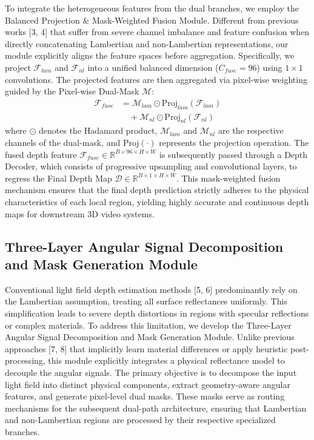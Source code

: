 \documentclass[lettersize,journal]{IEEEtran}
\begin{document}
To integrate the heterogeneous features from the dual branches, we employ the Balanced Projection \& Mask-Weighted Fusion Module. Different from previous works [3, 4] that suffer from severe channel imbalance and feature confusion when directly concatenating Lambertian and non-Lambertian representations, our module explicitly aligns the feature spaces before aggregation. Specifically, we project $\mathcal{F}_{lam}$ and $\mathcal{F}_{nl}$ into a unified balanced dimension ($C_{fuse} = 96$) using $1 \times 1$ convolutions. The projected features are then aggregated via pixel-wise weighting guided by the Pixel-wise Dual-Mask $\mathcal{M}$:
\begin{equation}
\begin{aligned}
\mathcal{F}_{fuse} &= \mathcal{M}_{lam} \odot \text{Proj}_{lam}(\mathcal{F}_{lam}) \\
&\quad + \mathcal{M}_{nl} \odot \text{Proj}_{nl}(\mathcal{F}_{nl})
\end{aligned}
\end{equation}
where $\odot$ denotes the Hadamard product, $\mathcal{M}_{lam}$ and $\mathcal{M}_{nl}$ are the respective channels of the dual-mask, and $\text{Proj}(\cdot)$ represents the projection operation. The fused depth feature $\mathcal{F}_{fuse} \in \mathbb{R}^{B \times 96 \times H \times W}$ is subsequently passed through a Depth Decoder, which consists of progressive upsampling and convolutional layers, to regress the Final Depth Map $\mathcal{D} \in \mathbb{R}^{B \times 1 \times H \times W}$. This mask-weighted fusion mechanism ensures that the final depth prediction strictly adheres to the physical characteristics of each local region, yielding highly accurate and continuous depth maps for downstream 3D video systems.

\subsection{Three-Layer Angular Signal Decomposition and Mask Generation Module}

Conventional light field depth estimation methods [5, 6] predominantly rely on the Lambertian assumption, treating all surface reflectances uniformly. This simplification leads to severe depth distortions in regions with specular reflections or complex materials. To address this limitation, we develop the Three-Layer Angular Signal Decomposition and Mask Generation Module. Unlike previous approaches [7, 8] that implicitly learn material differences or apply heuristic post-processing, this module explicitly integrates a physical reflectance model to decouple the angular signals. The primary objective is to decompose the input light field into distinct physical components, extract geometry-aware angular features, and generate pixel-level dual masks. These masks serve as routing mechanisms for the subsequent dual-path architecture, ensuring that Lambertian and non-Lambertian regions are processed by their respective specialized branches.
\end{document}
